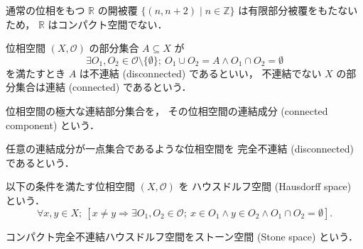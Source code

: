 \documentclass[titlepage]{ltjsreport}
\newtheorem[S]{theorem}{定理}[chapter]
\newtheorem[S]{definition}[theorem]{定義}
\newtheorem[S]{example}[theorem]{例}
\begin{document}
\begin{example}
  通常の位相をもつ
  $\mathbb{R}$
  の開被覆
  $\{(n,n+2)\mid n\in\mathbb{Z}\}$
  は有限部分被覆をもたないため，
  $\mathbb{R}$
  はコンパクト空間でない．
\end{example}

\begin{definition}[連結，不連結]
  位相空間 $(X,\mathcal{O})$ の部分集合 $A\subseteq X$ が
  \begin{equation}
    \exists O_1,O_2\in\mathcal{O}\setminus\{\emptyset\};
    \ O_1\cup O_2=A\wedge O_1\cap O_2=\emptyset
  \end{equation}
  を満たすとき $A$ は不連結 (disconnected) であるといい，
  不連結でない $X$ の部分集合は連結 (connected) であるという．
\end{definition}

\begin{definition}[連結成分]
  位相空間の極大な連結部分集合を，
  その位相空間の連結成分 (connected component) という．
\end{definition}

\begin{definition}[完全不連結]
  任意の連結成分が一点集合であるような位相空間を
  完全不連結 (disconnected) であるという．
\end{definition}

\begin{definition}[ハウスドルフ空間]
  以下の条件を満たす位相空間 $(X,\mathcal{O})$ を
  ハウスドルフ空間 (Hausdorff space) という．
  \begin{equation}
    \forall x,y\in X;
    \ \left[x\neq y\Longrightarrow\exists O_1,O_2\in\mathcal{O};
      \ x\in O_1\wedge y\in O_2\wedge O_1\cap O_2=\emptyset\right].
  \end{equation}
\end{definition}

\begin{definition}[ストーン空間]\label{def:stone-space}
  コンパクト完全不連結ハウスドルフ空間をストーン空間 (Stone space) という．
\end{definition}
\end{document}
